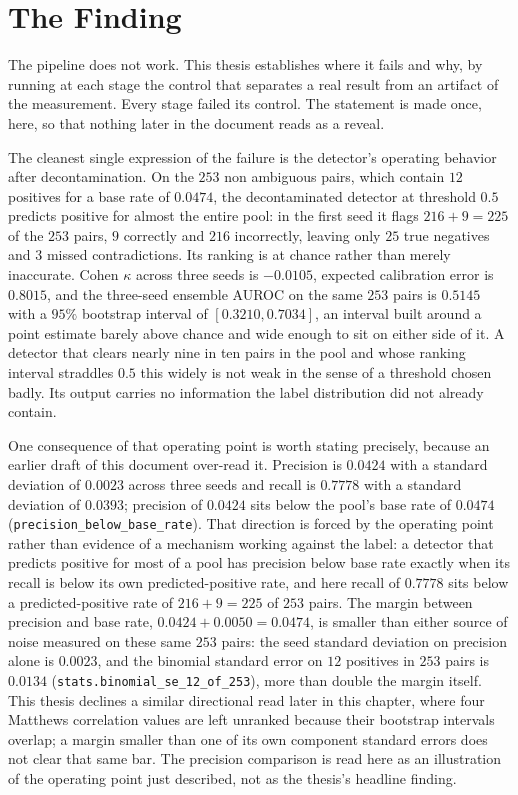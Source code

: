 \section{The Finding}
\label{sec:intro-finding}

The pipeline does not work. This thesis establishes where it fails and why, by
running at each stage the control that separates a real result from an artifact
of the measurement. Every stage failed its control. The statement is made once,
here, so that nothing later in the document reads as a reveal.

The cleanest single expression of the failure is the detector's operating
behavior after decontamination. On the $253$ non ambiguous pairs, which contain
$12$ positives for a base rate of $0.0474$, the decontaminated detector at
threshold $0.5$ predicts positive for almost the entire pool: in the first seed
it flags $216 + 9 = 225$ of the $253$ pairs, $9$ correctly and $216$
incorrectly, leaving only $25$ true negatives and $3$ missed contradictions.
Its ranking is at chance rather than merely inaccurate. Cohen $\kappa$ across
three seeds is $-0.0105$, expected calibration error is $0.8015$, and the
three-seed ensemble AUROC on the same $253$ pairs is $0.5145$ with a $95\%$
bootstrap interval of $[0.3210, 0.7034]$, an interval built around a point
estimate barely above chance and wide enough to sit on either side of it. A
detector that clears nearly nine in ten pairs in the pool and whose ranking
interval straddles $0.5$ this widely is not weak in the sense of a threshold
chosen badly. Its output carries no information the label distribution did not
already contain.

One consequence of that operating point is worth stating precisely, because an
earlier draft of this document over-read it. Precision is $0.0424$ with a
standard deviation of $0.0023$ across three seeds and recall is $0.7778$ with a
standard deviation of $0.0393$; precision of $0.0424$ sits below the pool's
base rate of $0.0474$
(\texttt{precision\_below\_base\_rate}). That direction is forced by the
operating point rather than evidence of a mechanism working against the label:
a detector that predicts positive for most of a pool has precision below base
rate exactly when its recall is below its own predicted-positive rate, and here
recall of $0.7778$ sits below a predicted-positive rate of $216 + 9 = 225$ of
$253$ pairs. The margin between precision and base rate,
$0.0424 + 0.0050 = 0.0474$, is smaller than either source of noise measured on
these same $253$ pairs: the seed standard deviation on precision alone is
$0.0023$, and the binomial standard error on $12$ positives in $253$ pairs is
$0.0134$ (\texttt{stats.binomial\_se\_12\_of\_253}), more than double the
margin itself. This thesis declines a similar directional read later in this
chapter, where four Matthews correlation values are left unranked because their
bootstrap intervals overlap; a margin smaller than one of its own component
standard errors does not clear that same bar. The precision comparison is read
here as an illustration of the operating point just described, not as the
thesis's headline finding.

